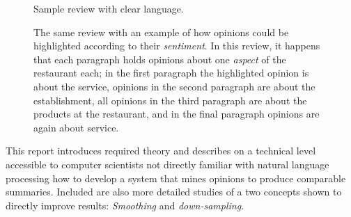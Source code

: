 \documentclass[a4paper,11pt]{kth-mag}
\begin{document}
\begin{figure}[t]
  \centering
  \caption{Sample review with clear language.}
  \label{fig:review_example}

  \caption{The same review with an example of how opinions could be highlighted according to their \emph{sentiment}.
    In this review, it happens that each paragraph holds opinions about one \emph{aspect}
    of the restaurant each; in the first paragraph the highlighted opinion is about the service,
    opinions in the second paragraph are about the establishment, all opinions in the third paragraph are about the products at the restaurant, and in the final paragraph opinions are again about service.
  }
  \label{fig:review_highlight}
\end{figure}

This report introduces required theory and describes on a technical level accessible to computer scientists
not directly familiar with natural language processing how to develop a system that
mines opinions to produce comparable summaries. Included are also more detailed studies of a two concepts
shown to directly improve results: \emph{Smoothing} and \emph{down-sampling}.
\end{document}
